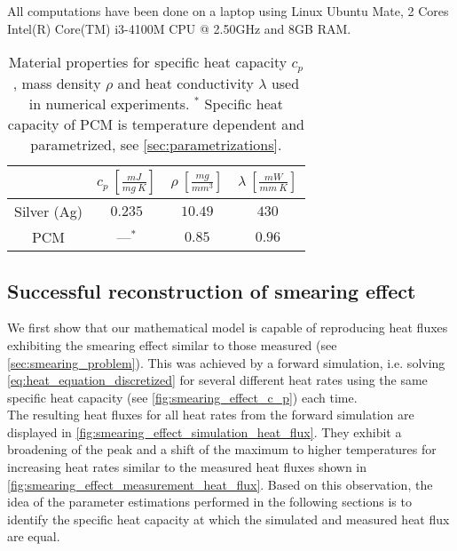 \documentclass{scrartcl}[12pt, halfparskip]
\numberwithin{equation}{section}
\numberwithin{figure}{section}
\numberwithin{table}{section}
\begin{document}

All computations have been done on a laptop using Linux Ubuntu Mate, 2 Cores Intel(R) Core(TM) i3-4100M CPU @ 2.50GHz and 8GB RAM. 


\begin{table}[H]
	\centering
	\caption{Material properties for specific heat capacity $c_p$, mass density $\rho$ and heat conductivity $\lambda$ used in numerical experiments. $^*$ Specific heat capacity of PCM is temperature dependent and parametrized, see \cref{sec:parametrizations}. \vspace{0.1cm}}
	\begin{tabular}{| c | c | c | c |} \hline
		& $c_p \ [\frac{mJ}{mg \ K}]$ & $\rho \ [\frac{mg}{mm^3}]$ & $\lambda \ [\frac{mW}{mm \ K}]$ \\ \hline
		Silver (Ag) & $0.235$ & $10.49$ & $430$ \\
		PCM & ---$^*$ & $0.85$ & $0.96$ \\ \hline
	\end{tabular}
	\label{tab:const_material_properties}
\end{table}

\subsection{Successful reconstruction of smearing effect}
We first show that our mathematical model is capable of reproducing heat fluxes exhibiting the smearing effect similar to those measured (see \cref{sec:smearing_problem}). This was achieved by a forward simulation, i.e. solving \cref{eq:heat_equation_discretized} for several different heat rates using the same specific heat capacity (see \cref{fig:smearing_effect_c_p}) each time. \\
The resulting heat fluxes for all heat rates from the forward simulation are displayed in \cref{fig:smearing_effect_simulation_heat_flux}. They exhibit a broadening of the peak and a shift of the maximum to higher temperatures for increasing heat rates similar to the measured heat fluxes shown in \cref{fig:smearing_effect_measurement_heat_flux}. 
Based on this observation, the idea of the parameter estimations performed in the following sections is to identify the specific heat capacity at which the simulated and measured heat flux are equal.
\end{document}
